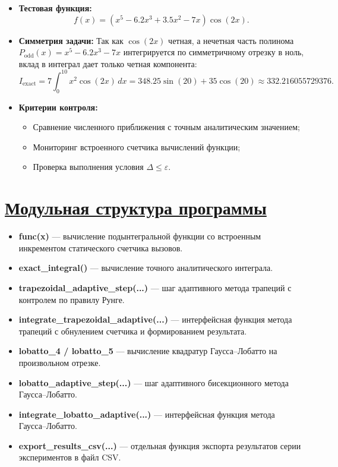 \documentclass[14pt]{extarticle}
\begin{document}
	\begin{itemize}
		\item \textbf{Тестовая функция:}
		\[
		f(x) = (x^5 - 6.2x^3 + 3.5x^2 - 7x)\cos(2x).
		\]
		\item \textbf{Симметрия задачи:}
		Так как $\cos(2x)$ четная, а нечетная часть полинома $P_{\text{odd}}(x) = x^5 - 6.2x^3 - 7x$ интегрируется по симметричному отрезку в ноль, вклад в интеграл дает только четная компонента:
		\[
		I_{\text{exact}} = 7 \int_0^{10} x^2 \cos(2x)\,dx = 348.25 \sin(20) + 35 \cos(20) \approx 332.216055729376.
		\]
		\item \textbf{Критерии контроля:}
		\begin{itemize}
			\item Сравнение численного приближения с точным аналитическим значением;
			\item Мониторинг встроенного счетчика вычислений функции;
			\item Проверка выполнения условия $\Delta \le \varepsilon$.
		\end{itemize}
	\end{itemize}
	
	
	\section{\Large \underline{Модульная структура программы}}
	
	\begin{itemize}[noitemsep]
		\item \textbf{func(x)} — вычисление подынтегральной функции со встроенным инкрементом статического счетчика вызовов.
		\item \textbf{exact\_integral()} — вычисление точного аналитического интеграла.
		\item \textbf{trapezoidal\_adaptive\_step(...)} — шаг адаптивного метода трапеций с контролем по правилу Рунге.
		\item \textbf{integrate\_trapezoidal\_adaptive(...)} — интерфейсная функция метода трапеций с обнулением счетчика и формированием результата.
		\item \textbf{lobatto\_4 / lobatto\_5} — вычисление квадратур Гаусса–Лобатто на произвольном отрезке.
		\item \textbf{lobatto\_adaptive\_step(...)} — шаг адаптивного бисекционного метода Гаусса–Лобатто.
		\item \textbf{integrate\_lobatto\_adaptive(...)} — интерфейсная функция метода Гаусса–Лобатто.
		\item \textbf{export\_results\_csv(...)} — отдельная функция экспорта результатов серии экспериментов в файл CSV.
	\end{itemize}
	
\end{document}
